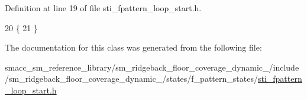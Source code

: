 Definition at line 19 of file sti\+\_\+fpattern\+\_\+loop\+\_\+start.\+h.


\begin{DoxyCode}
20   \{
21   \}
\end{DoxyCode}


The documentation for this class was generated from the following file\+:\begin{DoxyCompactItemize}
\item 
smacc\+\_\+sm\+\_\+reference\+\_\+library/sm\+\_\+ridgeback\+\_\+floor\+\_\+coverage\+\_\+dynamic\+\_/include/sm\+\_\+ridgeback\+\_\+floor\+\_\+coverage\+\_\+dynamic\+\_/states/f\+\_\+pattern\+\_\+states/\hyperlink{sm__ridgeback__floor__coverage__dynamic__1_2include_2sm__ridgeback__floor__coverage__dynamic__1_a219d35fb4db1c0d6ab13ed0f9855b3b}{sti\+\_\+fpattern\+\_\+loop\+\_\+start.\+h}\end{DoxyCompactItemize}
